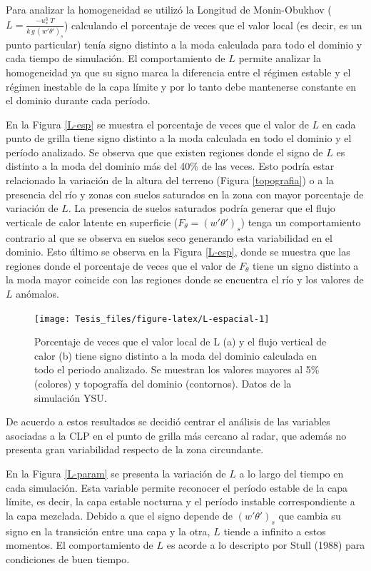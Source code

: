 \documentclass[12pt,spanish,oneside, a4paper]{book}
\begin{document}
Para analizar la homogeneidad se utilizó la Longitud de Monin-Obukhov
(\(L = \frac{-u_*^3 \;T}{k \, g \, (w'\theta ')_s}\)) calculando el
porcentaje de veces que el valor local (es decir, es un punto
particular) tenía signo distinto a la moda calculada para todo el
dominio y cada tiempo de simulación. El comportamiento de \(L\) permite
analizar la homogeneidad ya que su signo marca la diferencia entre el
régimen estable y el régimen inestable de la capa límite y por lo tanto
debe mantenerse constante en el dominio durante cada período.

En la Figura \ref{L-esp} se muestra el porcentaje de veces que el valor
de \(L\) en cada punto de grilla tiene signo distinto a la moda
calculada en todo el dominio y el período analizado. Se observa que que
existen regiones donde el signo de \(L\) es distinto a la moda del
dominio más del 40\% de las veces. Esto podría estar relacionado la
variación de la altura del terreno (Figura \ref{topografia}) o a la
presencia del río y zonas con suelos saturados en la zona con mayor
porcentaje de variación de \(L\). La presencia de suelos saturados
podría generar que el flujo verticale de calor latente en superficie
(\(F_{\theta} = (w'\theta ')_s\)) tenga un comportamiento contrario al
que se observa en suelos seco generando esta variabilidad en el dominio.
Esto último se observa en la Figura \ref{L-esp}, donde se muestra que
las regiones donde el porcentaje de veces que el valor de \(F_{\theta}\)
tiene un signo distinto a la moda mayor coincide con las regiones donde
se encuentra el río y los valores de \(L\) anómalos.

\begin{figure}

{\centering \texttt{[image: Tesis\_files/figure-latex/L-espacial-1]} 

}

\caption{Porcentaje de veces que el valor local de L (a) y el flujo vertical de calor (b) tiene signo distinto a la moda del dominio calculada en todo el periodo analizado. Se muestran los valores mayores al 5\% (colores) y topografía del dominio (contornos). Datos de la simulación YSU. \label{L-esp}}\label{fig:L-espacial}
\end{figure}

De acuerdo a estos resultados se decidió centrar el análisis de las
variables asociadas a la CLP en el punto de grilla más cercano al radar,
que además no presenta gran variabilidad respecto de la zona
circundante.

En la Figura \ref{L-param} se presenta la variación de \(L\) a lo largo
del tiempo en cada simulación. Esta variable permite reconocer el
período estable de la capa límite, es decir, la capa estable nocturna y
el período instable correspondiente a la capa mezclada. Debido a que el
signo depende de \((w'\theta ')_s\) que cambia su signo en la transición
entre una capa y la otra, \(L\) tiende a infinito a estos momentos. El
comportamiento de \(L\) es acorde a lo descripto por Stull (1988) para
condiciones de buen tiempo.
\end{document}
